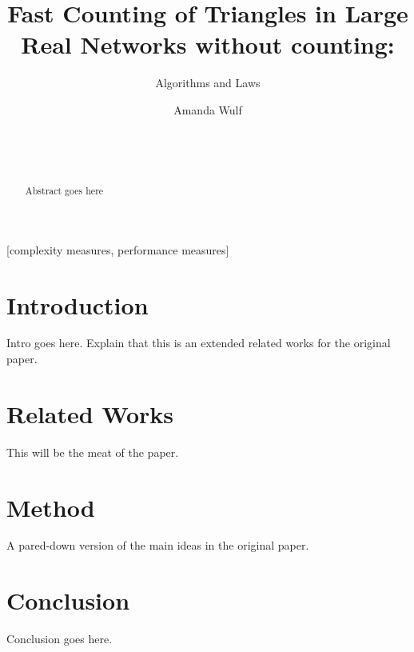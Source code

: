 \documentclass{acm_proc_article-sp}
\begin{document}
\title{Fast Counting of Triangles in Large Real Networks without counting:}
\subtitle{Algorithms and Laws}

\author{
\alignauthor
Amanda Wulf\\
       \\
       \\
       \\
}

\maketitle
\begin{abstract}
Abstract goes here
\end{abstract}

[complexity measures, performance measures]

\section{Introduction}
Intro goes here. Explain that this is an extended related works for the original paper.

\section{Related Works}
This will be the meat of the paper.

\section{Method}
A pared-down version of the main ideas in the original paper.

\section{Conclusion}
Conclusion goes here.

%

%
%
\end{document}
